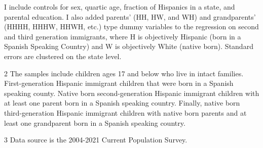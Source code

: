 \begin{table}[H]
{\begin{threeparttable}
\begin{tablenotes}
{                      I include controls for sex, quartic age, fraction of Hispanics in a state, and parental education.
                      I also added parents' (HH, HW, and WH) and grandparents' (HHHH, HHHW, HHWH, etc.) type dummy variables to the regression
                      on second and third generation immigrants, where H is objectively Hispanic (born in a Spanish Speaking Country) and W is objectively White (native born). 
                      Standard errors are clustered on the state level.}
\item[2] \footnotesize{The samples include children ages 17 and below who live in intact families. 
                      First-generation Hispanic immigrant children that were born in a 
                      Spanish speaking county. Native born second-generation Hispanic 
                      immigrant children with at least one parent born in a Spanish speaking 
                      country. Finally, native born third-generation Hispanic immigrant children 
                      with native born parents and at least one grandparent born in a Spanish 
                      speaking country.}
\item[3] \footnotesize{Data source is the 2004-2021 Current Population Survey.}
\end{tablenotes}
\end{threeparttable}}
\end{table}
